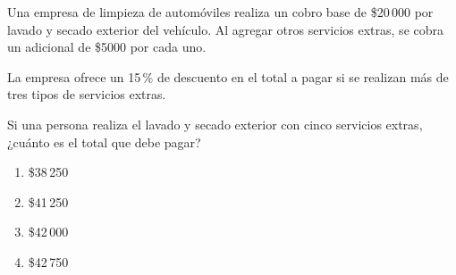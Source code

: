 \begin{problem}
    Una empresa de limpieza de automóviles realiza un cobro base de \$20\,000 por lavado y secado exterior del vehículo. Al agregar otros servicios extras, se cobra un adicional de \$5000 por cada uno.

    La empresa ofrece un 15\,\% de descuento en el total a pagar si se realizan más de tres tipos de servicios extras.

    Si una persona realiza el lavado y secado exterior con cinco servicios extras, ¿cuánto es el total que debe pagar?

    \begin{enumerate}[label=\Alph*.]
        \item \$38\,250
        \item \$41\,250
        \item \$42\,000
        \item \$42\,750
    \end{enumerate}
\end{problem}
